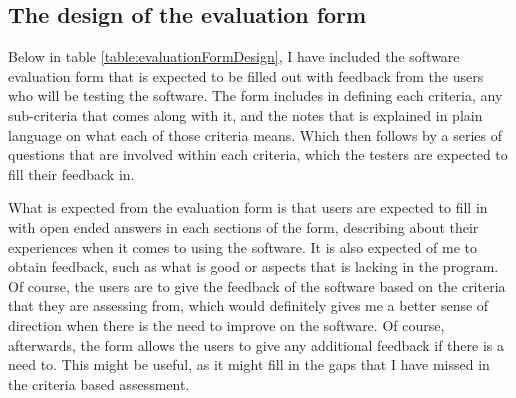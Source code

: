 \subsection{The design of the evaluation form}
Below in table \ref{table:evaluationFormDesign}, I have included the software evaluation form that is expected to be filled out with feedback from the users who will be testing the software. The form includes in defining each criteria, any sub-criteria that comes along with it, and the notes that is explained in plain language on what each of those criteria means. Which then follows by a series of questions that are involved within each criteria, which the testers are expected to fill their feedback in. 

What is expected from the evaluation form is that users are expected to fill in with open ended answers in each sections of the form, describing about their experiences when it comes to using the software. It is also expected of me to obtain feedback, such as what is good or aspects that is lacking in the program. Of course, the users are to give the feedback of the software based on the criteria that they are assessing from, which would definitely gives me a better sense of direction when there is the need to improve on the software. Of course, afterwards, the form allows the users to give any additional feedback if there is a need to. This might be useful, as it might fill in the gaps that I have missed in the criteria based assessment.

